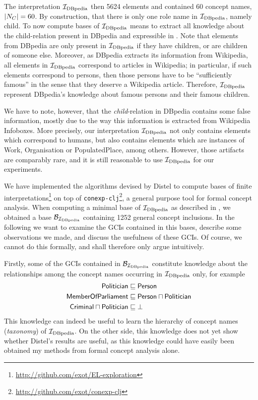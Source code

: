 The interpretation ${\mathcal{I}_{\text{DBpedia}}}$ then 5624 elements and contained 60 concept names, \ie
$\lvert N_C \rvert = 60$.  By construction, that there is only one role name in ${\mathcal{I}_{\text{DBpedia}}}$,
namely \textsf{child}.  To now compute bases of ${\mathcal{I}_{\text{DBpedia}}}$ means to extract all knowledge
about the child-relation present in DBpedia and expressible in \ELbot.  Note that elements
from DBpedia are only present in ${\mathcal{I}_{\text{DBpedia}}}$ if they have children, or are children of
someone else.  Moreover, as DBpedia extracts its information from Wikipedia, all elements
in ${\mathcal{I}_{\text{DBpedia}}}$ correspond to articles in Wikipedia; in particular, if such elements
correspond to persons, then those persons have to be ``sufficiently famous'' in the sense
that they deserve a Wikipedia article.  Therefore, ${\mathcal{I}_{\text{DBpedia}}}$ represent DBpedia's
knowledge about famous persons and their famous children.

We have to note, however, that the \emph{child}-relation in DBpedia contains some false
information, mostly due to the way this information is extracted from Wikipedia Infoboxes.
More precisely, our interpretation ${\mathcal{I}_{\text{DBpedia}}}$ not only contains elements which correspond
to humans, but also contains elements which are instances of \textsf{Work},
\textsf{Organisation} or \textsf{PopulatedPlace}, among others.  However, those artifacts
are comparably rare, and it is still reasonable to use ${\mathcal{I}_{\text{DBpedia}}}$ for our experiments.

We have implemented the algorithms devised by Distel to compute bases of finite
interpretations\footnote{\url{http://github.com/exot/EL-exploration}} on top of
\texttt{conexp-clj}\footnote{\url{http://github.com/exot/conexp-clj}}, a general purpose
tool for formal concept analysis.  When computing a minimal base of ${\mathcal{I}_{\text{DBpedia}}}$ as
described in , we obtained a base $\mathcal{B}_{{\mathcal{I}_{\text{DBpedia}}}}$
containing 1252 general concept inclusions.  In the following we want to examine the GCIs
contained in this bases, describe some observations we made, and discuss the usefulness of
these GCIs.  Of course, we cannot do this formally, and shall therefore only argue
intuitively.

Firstly, some of the GCIs contained in $\mathcal{B}_{\mathcal{I}_{\text{DBpedia}}}$ constitute knowledge about
the relationships among the concept names occurring in ${\mathcal{I}_{\text{DBpedia}}}$ only, for example
\begin{align*}
  \sf Politician &\sqsubseteq \sf Person \\
  \sf MemberOfParliament &\sqsubseteq \sf Person \sqcap Politician \\
  \sf Criminal \sqcap Politician &\sqsubseteq \bot
\end{align*}
This knowledge can indeed be useful to learn the hierarchy of concept names
(\emph{taxonomy}) of ${\mathcal{I}_{\text{DBpedia}}}$.  On the other side, this knowledge does not yet show
whether Distel's results are useful, as this knowledge could have easily been obtained my
methods from formal concept analysis alone.

